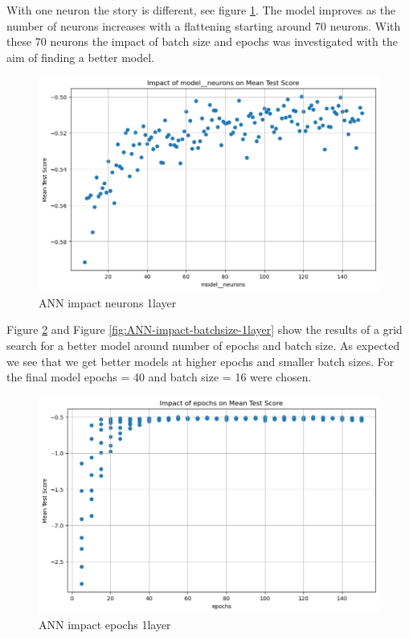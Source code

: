 \documentclass{article}
\begin{document}
With one neuron the story is different, see figure \ref{fig:ANN-impact-neurons-1layer}. The model improves as the number of neurons increases with a flattening starting around 70 neurons. With these 70 neurons the impact of batch size and epochs was investigated with the aim of finding a better model.

\begin{figure}
	\centering
	\includegraphics[width=\linewidth]{figures/ANN_impact_neurons_1layer.png}
	\caption{ANN impact neurons 1layer}
	\label{fig:ANN-impact-neurons-1layer}
\end{figure}

Figure \ref{fig:ANN-impact-epochs-1layer} and Figure \ref{fig:ANN-impact-batchsize-1layer} show the results of a grid search for a better model around number of epochs and batch size.
As expected we see that we get better models at higher epochs and smaller batch sizes. For the final model epochs = 40 and batch size = 16 were chosen.


\begin{figure}
	\centering
	\includegraphics[width=\linewidth]{figures/ANN_impact_epochs_1layer.png}
	\caption{ANN impact epochs 1layer}
	\label{fig:ANN-impact-epochs-1layer}
\end{figure}
\end{document}
